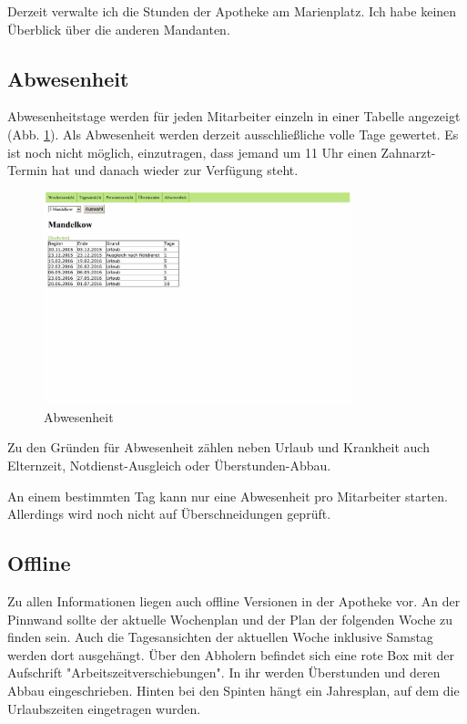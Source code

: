 \documentclass[10pt,a4paper,titlepage,oneside]{article}
\begin{document}
Derzeit verwalte ich die Stunden der Apotheke am Marienplatz. Ich habe keinen Überblick über die anderen Mandanten.


\subsection{Abwesenheit}
Abwesenheitstage werden für jeden Mitarbeiter einzeln in einer Tabelle angezeigt (Abb. \ref{fig:Abwesenheit}).
Als Abwesenheit werden derzeit ausschließliche volle Tage gewertet. Es ist noch nicht möglich, einzutragen, dass jemand um 11 Uhr einen Zahnarzt-Termin hat und danach wieder zur Verfügung steht.

\begin{figure}[h]
\centering
\includegraphics[width=0.8\textwidth]{abwesenheit-out}
\caption{Abwesenheit}
\label{fig:Abwesenheit}
\end{figure}

Zu den Gründen für Abwesenheit zählen neben Urlaub und Krankheit auch Elternzeit, Notdienst-Ausgleich oder Überstunden-Abbau.

An einem bestimmten Tag kann nur eine Abwesenheit pro Mitarbeiter starten. Allerdings wird noch nicht auf Überschneidungen geprüft.




\subsection{Offline}
Zu allen Informationen liegen auch offline Versionen in der Apotheke vor.
An der Pinnwand sollte der aktuelle Wochenplan und der Plan der folgenden Woche zu finden sein. Auch die Tagesansichten der aktuellen Woche inklusive Samstag werden dort ausgehängt. Über den Abholern befindet sich eine rote Box mit der Aufschrift "Arbeitszeitverschiebungen". In ihr werden Überstunden und deren Abbau eingeschrieben.
Hinten bei den Spinten hängt ein Jahresplan, auf dem die Urlaubszeiten eingetragen wurden.
\end{document}
